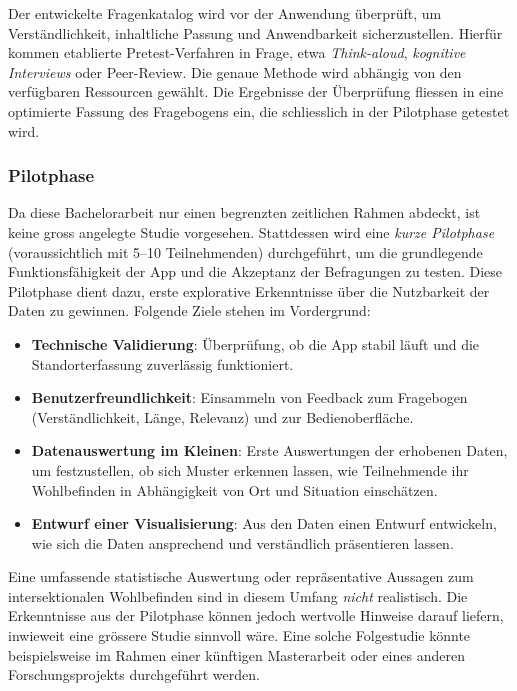 \documentclass{template}
\begin{document}
Der entwickelte Fragenkatalog wird vor der Anwendung überprüft, um Verständlichkeit, inhaltliche Passung und Anwendbarkeit sicherzustellen. Hierfür kommen etablierte Pretest-Verfahren in Frage, etwa \emph{Think-aloud}, \emph{kognitive Interviews} oder Peer-Review. Die genaue Methode wird abhängig von den verfügbaren Ressourcen gewählt. Die Ergebnisse der Überprüfung fliessen in eine optimierte Fassung des Fragebogens ein, die schliesslich in der Pilotphase getestet wird.

\subsubsection{Pilotphase}
Da diese Bachelorarbeit nur einen begrenzten zeitlichen Rahmen abdeckt, ist keine gross angelegte Studie vorgesehen. Stattdessen wird eine \textit{kurze Pilotphase} (voraussichtlich mit 5–10 Teilnehmenden) durchgeführt, um die grundlegende Funktionsfähigkeit der App und die Akzeptanz der Befragungen zu testen. Diese Pilotphase dient dazu, erste explorative Erkenntnisse über die Nutzbarkeit der Daten zu gewinnen. Folgende Ziele stehen im Vordergrund:

\begin{itemize}
    \item \textbf{Technische Validierung}: Überprüfung, ob die App stabil läuft und die Standorterfassung zuverlässig funktioniert.
    \item \textbf{Benutzerfreundlichkeit}: Einsammeln von Feedback zum Fragebogen (Verständlichkeit, Länge, Relevanz) und zur Bedienoberfläche.
    \item \textbf{Datenauswertung im Kleinen}: Erste Auswertungen der erhobenen Daten, um festzustellen, ob sich Muster erkennen lassen, wie Teilnehmende ihr Wohlbefinden in Abhängigkeit von Ort und Situation einschätzen.
    \item \textbf{Entwurf einer Visualisierung}: Aus den Daten einen Entwurf entwickeln, wie sich die Daten ansprechend und verständlich präsentieren lassen.
\end{itemize}

Eine umfassende statistische Auswertung oder repräsentative Aussagen zum intersektionalen Wohlbefinden sind in diesem Umfang \textit{nicht} realistisch. Die Erkenntnisse aus der Pilotphase können jedoch wertvolle Hinweise darauf liefern, inwieweit eine grössere Studie sinnvoll wäre. Eine solche Folgestudie könnte beispielsweise im Rahmen einer künftigen Masterarbeit oder eines anderen Forschungsprojekts durchgeführt werden.
\end{document}
